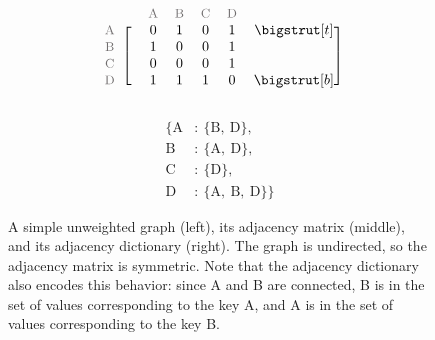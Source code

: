 \begin{figure}[H] %
\captionsetup[subfigure]{justification=centering}
\centering
\begin{subfigure}{.32\textwidth}
\centering
{}
\end{subfigure}
%
\begin{subfigure}{.32\textwidth}
\centering
\begin{align*}
    \begin{blockarray}{ccccccc}
    & & \small\text{\textcolor{gray}{A}} & \small\text{\textcolor{gray}{B}} & \small\text{\textcolor{gray}{C}} & \small\text{\textcolor{gray}{D}} & \\
    \begin{block}{c[cccccc]}
    \small\text{\textcolor{gray}{A}} & & 0 & 1 & 0 & 1 & \topstrut\\
    \small\text{\textcolor{gray}{B}} & & 1 & 0 & 0 & 1 & \\
    \small\text{\textcolor{gray}{C}} & & 0 & 0 & 0 & 1 & \\
    \small\text{\textcolor{gray}{D}} & & 1 & 1 & 1 & 0 & \botstrut\\
    \end{block}\end{blockarray}
\end{align*}
\end{subfigure}
%
\begin{subfigure}{.32\textwidth}
\centering
\begin{align*}
\{\text{A}&:\ \{\text{B},\ \text{D}\},\\
  \text{B}&:\ \{\text{A},\ \text{D}\},\\
  \text{C}&:\ \{\text{D}\},\\
  \text{D}&:\ \{\text{A},\ \text{B},\ \text{D}\}\}
\end{align*}
\end{subfigure}
\caption{A simple unweighted graph (left), its adjacency matrix (middle), and its adjacency dictionary (right).
The graph is undirected, so the adjacency matrix is symmetric.
Note that the adjacency dictionary also encodes this behavior: since A and B are connected, B is in the set of values corresponding to the key A, and A is in the set of values corresponding to the key B.}
\label{fig:bfs-simple-graph}
\end{figure}

